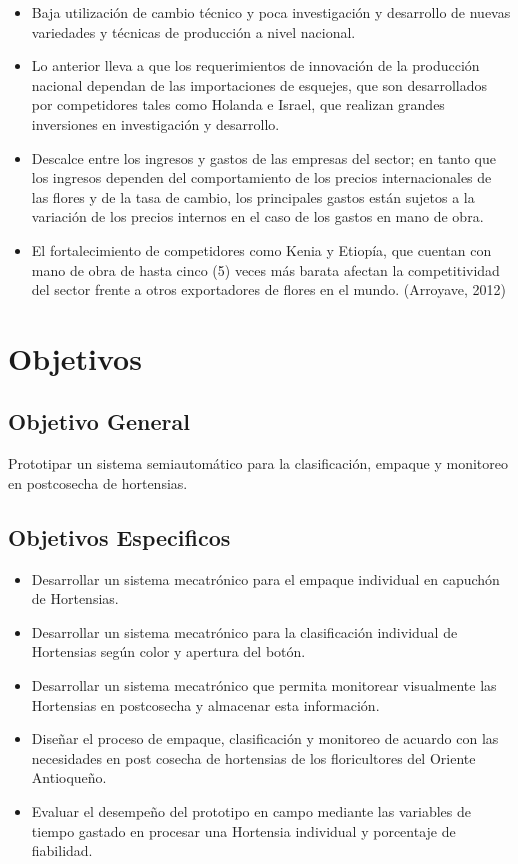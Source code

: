 \begin{itemize}
	\item Baja utilización de cambio técnico y poca investigación y desarrollo de nuevas variedades y técnicas de producción a nivel nacional.
	\item Lo anterior lleva a que los requerimientos de innovación de la producción nacional dependan de las importaciones de esquejes, que son desarrollados por competidores tales como Holanda e Israel, que realizan grandes inversiones en investigación y desarrollo. 
	\item Descalce entre los ingresos y gastos de las empresas del sector; en tanto que los ingresos dependen del comportamiento de los precios internacionales de las flores y de la tasa de cambio, los principales gastos están sujetos a la variación de los precios internos en el caso de los gastos en mano de obra.
	\item El fortalecimiento de competidores como Kenia y Etiopía, que cuentan con mano de obra de hasta cinco (5) veces más barata afectan la competitividad del sector frente a otros exportadores de flores en el mundo. (Arroyave, 2012) 
\end{itemize}

\section{Objetivos}

\subsection{Objetivo General}
Prototipar un sistema semiautomático para la clasificación, empaque y monitoreo en postcosecha de hortensias. 
\subsection{Objetivos Especificos}
\begin{itemize}
	\item Desarrollar un sistema mecatrónico para el empaque individual en capuchón de Hortensias.
	\item Desarrollar un sistema mecatrónico para la clasificación individual de Hortensias según color y apertura del botón.
	\item Desarrollar un sistema mecatrónico que permita monitorear visualmente las Hortensias en postcosecha y almacenar esta información.
	\item Diseñar el proceso de empaque, clasificación y monitoreo de acuardo con las necesidades en post cosecha de hortensias de los floricultores del Oriente Antioqueño.
	\item Evaluar el desempeño del prototipo en campo mediante las variables de tiempo gastado en procesar una Hortensia individual y porcentaje de fiabilidad.
	
\end{itemize}
